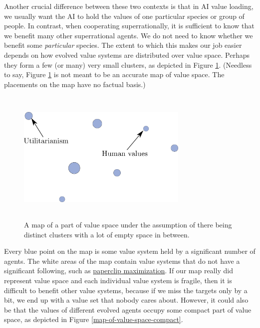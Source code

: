 Another crucial difference between these two contexts is that in AI
value loading, we usually want the AI to hold the values of one
particular species or group of people. In contrast, when cooperating
superrationally, it is sufficient to know that we benefit many other
superrational agents. We do not need to know whether we benefit some
\emph{particular} species. The extent to which this makes our job easier
depends on how evolved value systems are distributed over value space.
Perhaps they form a few (or many) very small clusters, as depicted in
Figure \ref{map-of-value-space-with-clusters}.
(Needless to say, Figure
\ref{map-of-value-space-with-clusters} is not meant to
be an accurate map of value space. The placements on the map have no
factual basis.)

\begin{figure}[h!]
    \centering
    \includegraphics[width=3.21875in,height=2.54167in]{figs/map-of-value-space-with-clusters}
    \caption{A map of a part of value
space under the assumption of there being distinct clusters with a lot
of empty space in between.}
    \label{map-of-value-space-with-clusters}
\end{figure}

Every blue point on the map is some value system held by a significant
number of agents. The white areas of the map contain value systems that
do not have a significant following, such as
\href{https://wiki.lesswrong.com/wiki/Paperclip_maximizer}{paperclip
maximization}. If our map really did represent value space and each
individual value system is fragile, then it is difficult to benefit
other value systems, because if we miss the targets only by a bit, we
end up with a value set that nobody cares about. However, it could also
be that the values of different evolved agents occupy some compact part
of value space, as depicted in Figure
\ref{map-of-value-space-compact}.

